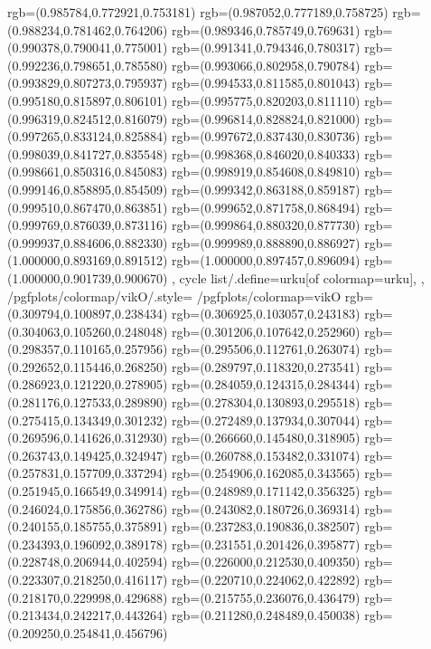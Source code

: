 {{{			rgb=(0.985784,0.772921,0.753181)
			rgb=(0.987052,0.777189,0.758725)
			rgb=(0.988234,0.781462,0.764206)
			rgb=(0.989346,0.785749,0.769631)
			rgb=(0.990378,0.790041,0.775001)
			rgb=(0.991341,0.794346,0.780317)
			rgb=(0.992236,0.798651,0.785580)
			rgb=(0.993066,0.802958,0.790784)
			rgb=(0.993829,0.807273,0.795937)
			rgb=(0.994533,0.811585,0.801043)
			rgb=(0.995180,0.815897,0.806101)
			rgb=(0.995775,0.820203,0.811110)
			rgb=(0.996319,0.824512,0.816079)
			rgb=(0.996814,0.828824,0.821000)
			rgb=(0.997265,0.833124,0.825884)
			rgb=(0.997672,0.837430,0.830736)
			rgb=(0.998039,0.841727,0.835548)
			rgb=(0.998368,0.846020,0.840333)
			rgb=(0.998661,0.850316,0.845083)
			rgb=(0.998919,0.854608,0.849810)
			rgb=(0.999146,0.858895,0.854509)
			rgb=(0.999342,0.863188,0.859187)
			rgb=(0.999510,0.867470,0.863851)
			rgb=(0.999652,0.871758,0.868494)
			rgb=(0.999769,0.876039,0.873116)
			rgb=(0.999864,0.880320,0.877730)
			rgb=(0.999937,0.884606,0.882330)
			rgb=(0.999989,0.888890,0.886927)
			rgb=(1.000000,0.893169,0.891512)
			rgb=(1.000000,0.897457,0.896094)
			rgb=(1.000000,0.901739,0.900670)
		},
	cycle list/.define={urku}{[of colormap=urku]},
	},
	/pgfplots/colormap/vikO/.style={
		/pgfplots/colormap={vikO}{%
			rgb=(0.309794,0.100897,0.238434)
			rgb=(0.306925,0.103057,0.243183)
			rgb=(0.304063,0.105260,0.248048)
			rgb=(0.301206,0.107642,0.252960)
			rgb=(0.298357,0.110165,0.257956)
			rgb=(0.295506,0.112761,0.263074)
			rgb=(0.292652,0.115446,0.268250)
			rgb=(0.289797,0.118320,0.273541)
			rgb=(0.286923,0.121220,0.278905)
			rgb=(0.284059,0.124315,0.284344)
			rgb=(0.281176,0.127533,0.289890)
			rgb=(0.278304,0.130893,0.295518)
			rgb=(0.275415,0.134349,0.301232)
			rgb=(0.272489,0.137934,0.307044)
			rgb=(0.269596,0.141626,0.312930)
			rgb=(0.266660,0.145480,0.318905)
			rgb=(0.263743,0.149425,0.324947)
			rgb=(0.260788,0.153482,0.331074)
			rgb=(0.257831,0.157709,0.337294)
			rgb=(0.254906,0.162085,0.343565)
			rgb=(0.251945,0.166549,0.349914)
			rgb=(0.248989,0.171142,0.356325)
			rgb=(0.246024,0.175856,0.362786)
			rgb=(0.243082,0.180726,0.369314)
			rgb=(0.240155,0.185755,0.375891)
			rgb=(0.237283,0.190836,0.382507)
			rgb=(0.234393,0.196092,0.389178)
			rgb=(0.231551,0.201426,0.395877)
			rgb=(0.228748,0.206944,0.402594)
			rgb=(0.226000,0.212530,0.409350)
			rgb=(0.223307,0.218250,0.416117)
			rgb=(0.220710,0.224062,0.422892)
			rgb=(0.218170,0.229998,0.429688)
			rgb=(0.215755,0.236076,0.436479)
			rgb=(0.213434,0.242217,0.443264)
			rgb=(0.211280,0.248489,0.450038)
			rgb=(0.209250,0.254841,0.456796)
}}}
